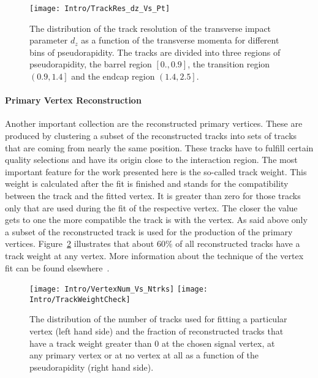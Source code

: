 \begin{figure}[Htb]
    \centering
    \texttt{[image: Intro/TrackRes\_dz\_Vs\_Pt]}
    \caption[Track resolution \vs pseudo rapidity for different bins of transverse momentum]{The distribution of the track resolution of the transverse impact parameter $d_{z}$ as a function of the transverse momenta for different bins of pseudorapidity. The tracks are divided into three regions of pseudorapidity, the barrel region $\left[0., 0.9\right]$, the transition region $\left(0.9, 1.4\right]$ and the endcap region $\left(1.4, 2.5\right]$. \label{plot:IntroTrackRes}}
\end{figure}

\paragraph*{Primary Vertex Reconstruction}

Another important collection are the reconstructed primary vertices. These are produced by clustering a subset of the reconstructed tracks into sets of tracks that are coming from nearly the same position. These tracks have to fulfill certain quality selections and have its origin close to the interaction region. The most important feature for the work presented here is the so-called track weight. This weight is calculated after the fit is finished and stands for the compatibility between the track and the fitted vertex. It is greater than zero for those tracks only that are used during the fit of the respective vertex. The closer the value gets to one the more compatible the track is with the vertex. As said above only a subset of the reconstructed track is used for the production of the primary vertices. Figure~\ref{plot:IntroTrackWeight} illustrates that about $60\%$ of all reconstructed tracks have a track weight at any vertex.  More information about the technique of the vertex fit can be found elsewhere~\cite{CMS-PAPER-TRK-11-001}.

\begin{figure}[Htb]
    \centering
    \texttt{[image: Intro/VertexNum\_Vs\_Ntrks]}
    \texttt{[image: Intro/TrackWeightCheck]}
    \caption[Distribution of number of tracks used for fitting the vertices and fraction of reconstructed tracks that have a track weight at any primary vertex]{The distribution of the number of tracks used for fitting a particular vertex (left hand side) and the fraction of reconstructed tracks that have a track weight greater than 0 at the chosen signal vertex, at any primary vertex or at no vertex at all as a function of the pseudorapidity (right hand side). \label{plot:IntroTrackWeight}}
\end{figure}

